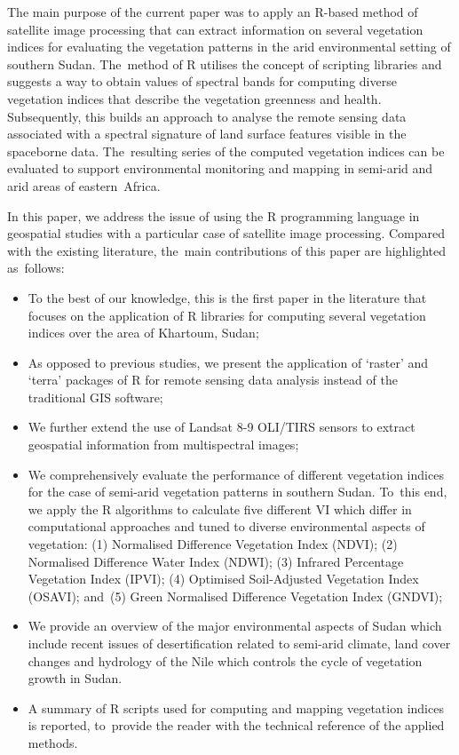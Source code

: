 \documentclass[jimaging,article,accept,pdftex,moreauthors]{Definitions/mdpi}
\begin{document}
The main purpose of the current paper was to apply an R-based method of satellite image processing that can extract information on several vegetation indices for evaluating the vegetation patterns in the arid environmental setting of southern Sudan. The~method of R utilises the concept of scripting libraries and suggests a way to obtain values of spectral bands for computing diverse vegetation indices that describe the vegetation greenness and health. Subsequently, this builds an approach to analyse the remote sensing data associated with a spectral signature of land surface features visible in the spaceborne data. The~resulting series of the computed vegetation indices can be evaluated to support environmental monitoring and mapping in semi-arid and arid areas of eastern~Africa.

In this paper, we address the issue of using the R programming language in geospatial studies with a particular case of satellite image processing. Compared with the existing literature, the~main contributions of this paper are highlighted as~follows:
\begin{itemize}
	\item To the best of our knowledge, this is the first paper in the literature that focuses on the application of R libraries for computing several vegetation indices over the area of Khartoum, Sudan;
	\item As opposed to previous studies, we present the application of `raster' and `terra' packages of R for remote sensing data analysis instead of the traditional GIS software;
	\item We further extend the use of Landsat 8-9 OLI/TIRS sensors to extract geospatial information from multispectral images;
	\item We comprehensively evaluate the performance of different vegetation indices for the case of semi-arid vegetation patterns in southern Sudan. To~this end, we apply the R algorithms to calculate five different VI which differ in computational approaches and tuned to diverse environmental aspects of vegetation: (1) Normalised Difference Vegetation Index (NDVI); (2) Normalised Difference Water Index (NDWI); (3) Infrared Percentage Vegetation Index (IPVI); (4) Optimised Soil-Adjusted Vegetation Index (OSAVI); and~(5) Green Normalised Difference Vegetation Index (GNDVI);
	\item We provide an overview of the major environmental aspects of Sudan which include recent issues of desertification related to semi-arid climate, land cover changes and hydrology of the Nile which controls the cycle of vegetation growth in Sudan.
	\item A summary of R scripts used for computing and mapping vegetation indices is reported, to~provide the reader with the technical reference of the applied methods.
\end{itemize}
\end{document}
